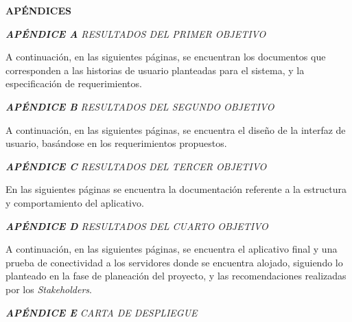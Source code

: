 \documentclass[spanish]{ieee_upb}
\begin{document}
\newpage
\renewcommand\refname{REFERENCIAS}

\newpage
\renewcommand\refname{REFERENCIAS}



\newpage
{}
\begin{center}
\textbf{APÉNDICES}
\end{center}
\appendix

\raggedright\textit{\textbf{APÉNDICE A} RESULTADOS DEL PRIMER OBJETIVO}
\label{APÉNDICE:a}

A continuación, en las siguientes páginas, se encuentran los documentos que corresponden a las historias de usuario planteadas para el sistema, y la especificación de requerimientos. 





\raggedright\textit{\textbf{APÉNDICE B} RESULTADOS DEL SEGUNDO OBJETIVO}
\label{APÉNDICE:B}

A continuación, en las siguientes páginas, se encuentra el diseño de la interfaz de usuario, basándose en los requerimientos propuestos. 



\raggedright\textit{\textbf{APÉNDICE C} RESULTADOS DEL TERCER OBJETIVO}
\label{APÉNDICE:C}

En las siguientes páginas se encuentra la documentación referente a la estructura y comportamiento
del aplicativo.  



\raggedright\textit{\textbf{APÉNDICE D} RESULTADOS DEL CUARTO OBJETIVO}
\label{APÉNDICE:D}

A continuación, en las siguientes páginas, se encuentra el aplicativo final y una prueba de conectividad a los servidores donde se encuentra alojado, siguiendo lo planteado en la fase de planeación del proyecto, y las recomendaciones realizadas por los \textit{Stakeholders}. 




\raggedright\textit{\textbf{APÉNDICE E} CARTA DE DESPLIEGUE}
\label{APÉNDICE:E}
\end{document}
